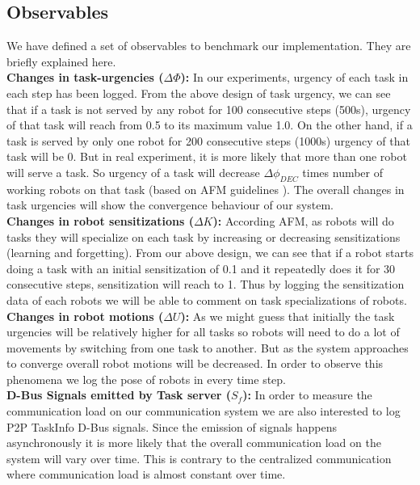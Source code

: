 \subsection{Observables}
We have defined a set of observables to benchmark our implementation. They are briefly explained here.\\
\textbf{Changes in task-urgencies ($\Delta \Phi$): }
In our experiments, urgency of each task in each step has been logged. From the above design of task urgency, we can see that if a task is not served by any robot for 100 consecutive steps (500s), urgency of that task will reach from 0.5 to its maximum value 1.0. On the other hand, if a task is served by only one robot for 200 consecutive steps (1000s) urgency of that task will be 0. But in real experiment, it is more likely that more than one robot will serve a task. So urgency of a task will decrease $\Delta\phi_{DEC}$ times number of working robots on that task (based on AFM guidelines \cite{Elsa}). The overall changes in task urgencies will show the convergence behaviour of our system.\\
\textbf{Changes in robot sensitizations ($\Delta K$): }
According AFM, as robots will do tasks they will specialize on each task by increasing or decreasing sensitizations (learning and forgetting). From our above design, we can see that if a robot starts doing a task with an initial sensitization of 0.1 and it repeatedly does it for 30 consecutive steps, sensitization will reach to 1. Thus by logging the sensitization data of each robots we will be able to comment on task specializations of robots.\\
\textbf{Changes in robot motions ($\Delta U$): }
As we might guess that initially the task urgencies will be relatively higher for all tasks so robots will need to do a lot of movements by switching from one task to another. But as the system approaches to converge overall robot motions will be decreased. In order to observe this phenomena we log the pose of robots in every time step.\\
\textbf{D-Bus Signals emitted by Task server ($S_f$):} 
In order to measure the communication load on our communication system we are also interested to log P2P TaskInfo D-Bus signals. Since the emission of signals happens asynchronously it is more likely that the overall communication load on the system will vary over time. This is contrary to the centralized communication where communication load is almost constant over time.
